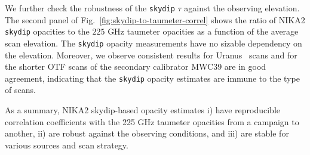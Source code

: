 We further check the robustness of the {\tt skydip} $\tau$ against the
observing elevation. 
The second panel of Fig.~\ref{fig:skydip-to-taumeter-correl} shows the ratio of NIKA2
{\tt skydip} opacities to the $225$ GHz taumeter opacities as a function of
the average scan elevation. The {\tt skydip} opacity measurements have no
sizable dependency on the elevation. Moreover, we observe consistent
results for Uranus \bm\ scans and for
the shorter OTF scans of the secondary calibrator MWC39 are in good
agreement, indicating that the {\tt skydip} opacity estimates are
immune to the type of scans. 

As a summary, NIKA2 skydip-based opacity estimates i) have reproducible
correlation coefficients with the 225 GHz taumeter opacities from a
campaign to another, ii) are robust against the observing conditions,
and iii) are stable for various sources and scan strategy. 

